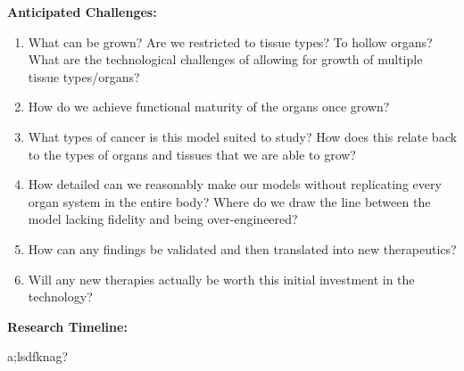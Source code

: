 \documentclass[11pt,letterpaper,final] {article}
\begin{document}
{\bfseries Anticipated Challenges:}
\begin{enumerate}
	\item What can be grown? Are we restricted to tissue types? To hollow organs? What are the technological challenges of allowing for growth of multiple tissue types/organs?
	\item How do we achieve functional maturity of the organs once grown?
	\item What types of cancer is this model suited to study? How does this relate back to the types of organs and tissues that we are able to grow?
	\item How detailed can we reasonably make our models without replicating every organ system in the entire body? Where do we draw the line between the model lacking fidelity and being over-engineered?
	\item How can any findings be validated and then translated into new therapeutics?
	\item Will any new therapies actually be worth this initial investment in the technology?
\end{enumerate}

{\bfseries Research Timeline:}

a;lsdfknag?
\end{document}
